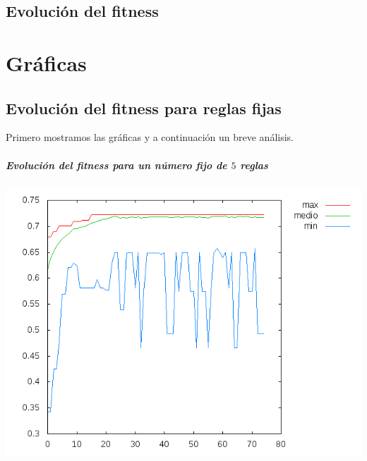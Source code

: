 \documentclass[nochap]{apuntes}
\begin{document}
\section{Evolución del fitness}



\appendix

\chapter{Gráficas}
\section{Evolución del fitness para reglas fijas}

Primero mostramos las gráficas y a continuación un breve análisis.
\paragraph{Evolución del fitness para un número fijo de $5$ reglas}
\begin{center}
\includegraphics[scale=0.5]{tex/img/g75_p75_MejoresPorPeores_SeleccionProporcionalAlFitness_reg5.png}
\end{center}
\end{document}
